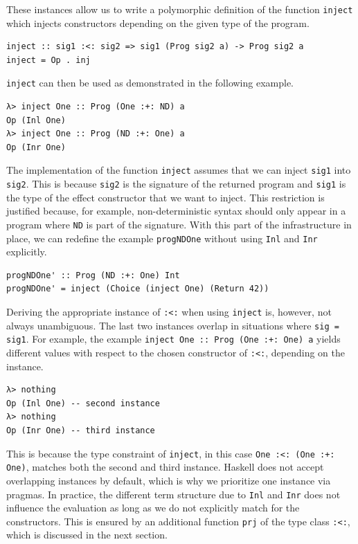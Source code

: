 \documentclass[a4paper, 11pt, fleqn, twoside]{scrreprt}
\newcommand{\hinl}[1]{\texttt{#1}}
\begin{document}
These instances allow us to write a polymorphic definition of the function \hinl{inject} which injects constructors depending on the given type of the program.

\begin{verbatim}
inject :: sig1 :<: sig2 => sig1 (Prog sig2 a) -> Prog sig2 a
inject = Op . inj
\end{verbatim}

\hinl{inject} can then be used as demonstrated in the following example.

\begin{verbatim}
λ> inject One :: Prog (One :+: ND) a
Op (Inl One)
λ> inject One :: Prog (ND :+: One) a
Op (Inr One)
\end{verbatim}

The implementation of the function \hinl{inject} assumes that we can inject \hinl{sig1} into \hinl{sig2}.
This is because \hinl{sig2} is the signature of the returned program and \hinl{sig1} is the type of the effect constructor that we want to inject.
This restriction is justified because, for example, non-deterministic syntax should only appear in a program where \hinl{ND} is part of the signature.
With this part of the infrastructure in place, we can redefine the example \hinl{progNDOne} without using \hinl{Inl} and \hinl{Inr} explicitly.

\begin{verbatim}
progNDOne' :: Prog (ND :+: One) Int
progNDOne' = inject (Choice (inject One) (Return 42))
\end{verbatim}

Deriving the appropriate instance of \hinl{:<:} when using \hinl{inject} is, however, not always unambiguous.
The last two instances overlap in situations where \hinl{sig = sig1}.
For example, the example \hinl{inject One :: Prog (One :+: One) a} yields different values with respect to the chosen constructor of \hinl{:<:}, depending on the instance.

\begin{verbatim}
λ> nothing
Op (Inl One) -- second instance
λ> nothing
Op (Inr One) -- third instance
\end{verbatim}

This is because the type constraint of \hinl{inject}, in this case \hinl{One :<: (One :+: One)}, matches both the second and third instance.
Haskell does not accept overlapping instances by default, which is why we prioritize one instance via pragmas.
In practice, the different term structure due to \hinl{Inl} and \hinl{Inr} does not influence the evaluation as long as we do not explicitly match for the constructors.
This is ensured by an additional function \hinl{prj} of the type class \hinl{:<:}, which is discussed in the next section.
\end{document}
